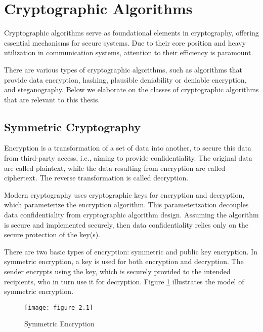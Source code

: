 \section{Cryptographic Algorithms}
Cryptographic algorithms serve as foundational elements in cryptography, offering essential mechanisms for secure systems. Due to their core position and heavy utilization in communication systems, attention to their efficiency is paramount.

There are various types of cryptographic algorithms, such as algorithms that provide data encryption, hashing, plausible deniability or deniable encryption, and steganography. Below we elaborate on the classes of cryptographic algorithms that are relevant to this thesis.


\subsection{Symmetric Cryptography}

Encryption is a transformation of a set of data into another, to secure this data from third-party access, i.e., aiming to provide confidentiality. The original data are called plaintext, while the data resulting from encryption are called ciphertext. The reverse transformation is called decryption.

Modern cryptography uses cryptographic keys for encryption and decryption, which parameterize the encryption algorithm. This parameterization decouples data confidentiality from cryptographic algorithm design. Assuming the algorithm is secure and implemented securely, then data confidentiality relies only on the secure protection of the key(s).

There are two basic types of encryption: symmetric and public key encryption. In symmetric encryption, a key is used for both encryption and decryption. The sender encrypts using the key, which is securely provided to the intended recipients, who in turn use it for decryption. Figure \ref{fig:figure2.1} illustrates the model of symmetric encryption.

\begin{figure}[h!]
\centering
\texttt{[image: figure\_2.1]}\\
\caption{Symmetric Encryption}
\label{fig:figure2.1}
\end{figure}



